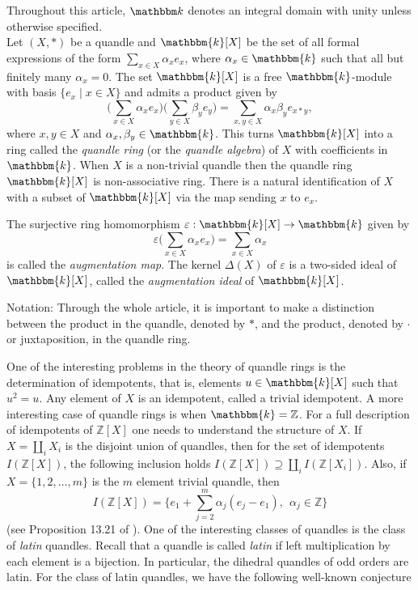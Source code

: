\documentclass[12pt]{amsart}
\theoremstyle{definition}
\theoremstyle{remark}
\newcommand{\Z}{\mathbb{Z}}
\begin{document}
Throughout this article, $\mathbbm k$ denotes an integral domain with unity unless otherwise specified.\\
  
  
Let $(X, *)$ be a quandle and  $\mathbbm{k}[X]$ be the set of all formal expressions of the form $\sum_{x \in X }  \alpha_x e_x$, where $\alpha_x \in \mathbbm{k}$ such that all but finitely many $\alpha_x=0$.  The set $\mathbbm{k}[X]$ is a free $\mathbbm{k}$-module with basis $\{e_x \mid x \in X \}$ and admits a product given by 
 $$ \Big( \sum_{x \in X }  \alpha_x e_x \Big) \Big( \sum_{ y \in X }  \beta_y e_y \Big)
 =   \sum_{x, y \in X } \alpha_x \beta_y e_{x * y},$$
where $x, y \in X$ and $\alpha_x, \beta_y \in \mathbbm{k}$. This turns $\mathbbm{k}[X]$ into a ring called the {\it quandle ring} (or the {\it quandle algebra}) of $X$ with coefficients in $\mathbbm{k}$.  When $X$ is a non-trivial quandle then the quandle ring $\mathbbm{k}[X]$ is non-associative ring.  There is a natural identification of $X$ with a subset of $\mathbbm{k}[X]$ via the map sending $x$ to $e_x$. 
\par
The surjective ring homomorphism $\varepsilon: \mathbbm{k}[X] \rightarrow \mathbbm{k}$ given by $$\varepsilon \Big(\sum_{x \in X }  \alpha_x e_x \Big)=\sum_{x \in X }  \alpha_x$$
is called the {\it augmentation map}. The kernel $\Delta(X)$ of $\varepsilon $ is a two-sided ideal of $\mathbbm{k}[X]$, called the {\it augmentation ideal} of $\mathbbm{k}[X]$. 

 {Notation:}   Through the whole article, it is important to make a distinction between the product in the quandle, denoted by $*$, and the product, denoted by $\cdot$ or juxtaposition, in the quandle ring.  
 
\medskip


One of the interesting problems in the theory of quandle rings is the determination of idempotents, that is, elements $u \in \mathbbm{k}[X]$ such that $u^2 = u$.  Any element of $X$ is an idempotent, called a trivial idempotent. A more interesting case of quandle rings is when $\mathbbm{k} = \Z$.  
 For a full description of idempotents of  $\Z[X]$ one needs to understand the structure of $X$. 
If  $X = \coprod_i X_i$ is the disjoint union of quandles, then for the set of idempotents $I(\Z[X])$, the following inclusion holds $I(\Z[X]) \supseteq \coprod_i I(\Z[X_i])$.
Also, if 
 $X = \{ {1}, {2}, \ldots, {m} \}$ is the $m$ element trivial quandle, then 
 $$
 I(\Z[X]) = \{ e_{1} + \sum_{j=2}^m \alpha_j (e_{j} - e_{1}),~~\alpha_j \in \Z \}
  $$
(see Proposition 13.21 of \cite{BES}).  One of the interesting classes of quandles is the class of \emph{latin} quandles. Recall that a quandle is called {\it latin} if left multiplication by each element is a bijection.
In particular, the  dihedral quandles of odd orders  are latin.   
For the class of latin quandles, we have the following well-known conjecture
\end{document}
